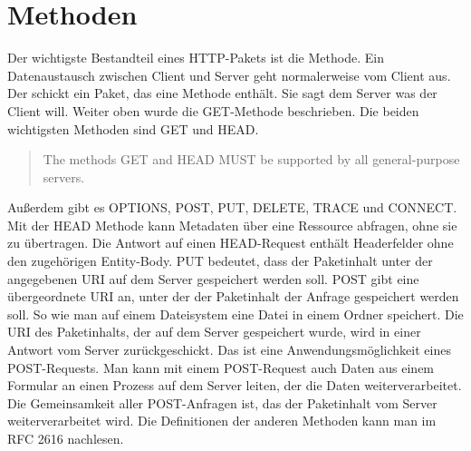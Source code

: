 \documentclass{llncs}
\begin{document}
\section{Methoden}
Der wichtigste Bestandteil eines HTTP-Pakets ist die Methode. Ein Datenaustausch zwischen Client und Server geht normalerweise vom Client aus. Der schickt ein Paket, das eine Methode enthält. Sie sagt dem Server was der Client will. Weiter oben wurde die GET-Methode beschrieben. Die beiden wichtigsten Methoden sind GET und HEAD. \begin{quote} The methods GET and HEAD MUST be supported by all general-purpose servers.\cite{Fielding1999} \end{quote}
Außerdem gibt es OPTIONS, POST, PUT, DELETE, TRACE und CONNECT. Mit der HEAD Methode kann Metadaten über eine Ressource abfragen, ohne sie zu übertragen. Die Antwort auf einen HEAD-Request enthält Headerfelder ohne den zugehörigen Entity-Body.  PUT bedeutet, dass der Paketinhalt unter der angegebenen URI auf dem Server gespeichert werden soll. POST gibt eine übergeordnete URI an, unter der der Paketinhalt der Anfrage gespeichert werden soll. So wie man auf einem Dateisystem eine Datei in einem Ordner speichert. Die URI des Paketinhalts, der auf dem Server gespeichert wurde, wird in einer Antwort vom Server zurückgeschickt. Das ist eine Anwendungsmöglichkeit eines POST-Requests. Man kann mit einem POST-Request auch Daten aus einem Formular an einen Prozess auf dem Server leiten, der die Daten weiterverarbeitet.
Die Gemeinsamkeit aller POST-Anfragen ist, das der Paketinhalt vom Server weiterverarbeitet wird. Die Definitionen der anderen Methoden kann man im RFC 2616 nachlesen.
\end{document}
